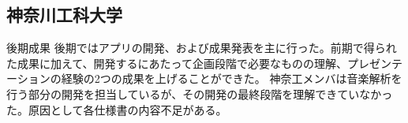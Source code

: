 \subsection{神奈川工科大学}
後期成果
後期ではアプリの開発、および成果発表を主に行った。前期で得られた成果に加えて、開発するにあたって企画段階で必要なものの理解、プレゼンテーションの経験の2つの成果を上げることができた。
神奈工メンバは音楽解析を行う部分の開発を担当しているが、その開発の最終段階を理解できていなかった。原因として各仕様書の内容不足がある。
